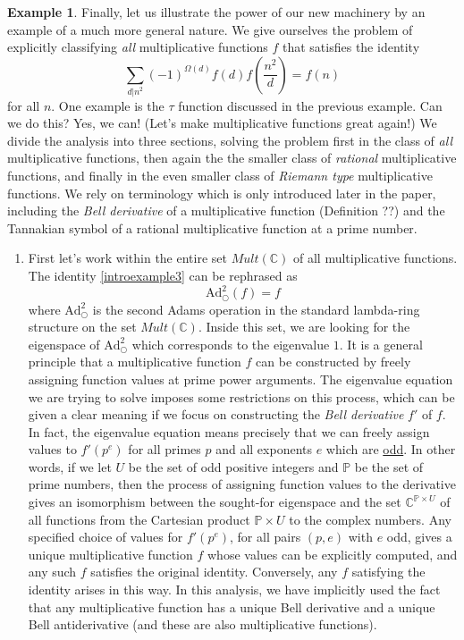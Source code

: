 \documentclass[a4paper]{article}
\theoremstyle{definition}
\newtheorem{example}{Example}[section]
\theoremstyle{remark}
\newcommand{\adam}[1]{\text{Ad}^{#1}_{\bigcirc}}
\newcommand{\bbP}{\mathbb{P}}
\newcommand{\C}{\mathbb{C}}
\begin{document}
\begin{example}
Finally, let us illustrate the power of our new machinery by an example of a much more general nature. We give ourselves the problem of explicitly classifying \emph{all} multiplicative functions $f$ that satisfies the identity 
\begin{equation} \label{introexample3}
\sum_{d \vert n^2} (-1)^{\Omega(d)} f(d) f (\frac{n^2}{d}) = f(n)  
\end{equation}
for all $n$. One example is the $\tau$ function discussed in the previous example. Can we do this? Yes, we can! (Let's make multiplicative functions great again!) We divide the analysis into three sections, solving the problem first in the class of \emph{all} multiplicative functions, then again the the smaller class of \emph{rational} multiplicative functions, and finally in the even smaller class of \emph{Riemann type} multiplicative functions. We rely on terminology which is only introduced later in the paper, including the \emph{Bell derivative} of a multiplicative function (Definition ??) and the Tannakian symbol of a rational multiplicative function at a prime number. 


\begin{enumerate}
\item First let's work within the entire set $Mult(\C)$ of all multiplicative functions. The identity \ref{introexample3} can be rephrased as 
$$ \adam{2}(f) = f  $$
where $\adam{2}$ is the second Adams operation in the standard lambda-ring structure on the set $Mult(\C)$. Inside this set, we are looking for the eigenspace of $\adam{2}$ which corresponds to the eigenvalue $1$. It is a general principle that a multiplicative function $f$ can be constructed by freely assigning function values at prime power arguments. The eigenvalue equation we are trying to solve imposes some restrictions on this process, which can be given a clear meaning if we focus on constructing the \emph{Bell derivative} $f'$ of $f$. In fact, the eigenvalue equation means precisely that we can freely assign values to $f'(p^e)$ for all primes $p$ and all exponents $e$ which are \underline{odd}. In other words, if we let $U$ be the set of odd positive integers and $\bbP$ be the set of prime numbers, then the process of assigning function values to the derivative gives an isomorphism between the sought-for eigenspace and the set $\C^{\bbP \times U}$ of all functions from the Cartesian product $\bbP \times U$ to the complex numbers. Any specified choice of values for $f'(p^e)$, for all pairs $(p, e)$  with $e$ odd, gives a unique multiplicative function $f$ whose values can be explicitly computed, and any such $f$ satisfies the original identity. Conversely, any $f$ satisfying the identity arises in this way. In this analysis, we have implicitly used the fact that any multiplicative function has a unique Bell derivative and a unique Bell antiderivative (and these are also multiplicative functions). 
 

\end{enumerate}
\end{example}
\end{document}
